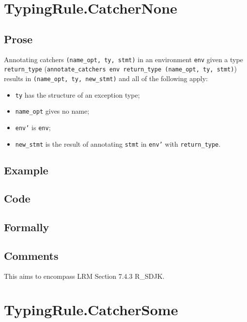 \documentclass{book}
\begin{document}
\section{TypingRule.CatcherNone \label{sec:TypingRule.CatcherNone}}

  \subsection{Prose}
   Annotating catchers \texttt{(name\_opt, ty, stmt)} in an environment
\texttt{env} given a type \texttt{return\_type} (\texttt{annotate\_catchers env
return\_type (name\_opt, ty, stmt)}) results in \texttt{(name\_opt, ty,
new\_stmt)} and all of the following apply:
   \begin{itemize}
   \item \texttt{ty} has the structure of an exception type;
   \item \texttt{name\_opt} gives no name;
   \item \texttt{env'} is \texttt{env};
   \item \texttt{new\_stmt} is the result of annotating \texttt{stmt} in \texttt{env'} with \texttt{return\_type}.
   \end{itemize}

  \subsection{Example}

  \subsection{Code}

\begin{emptyformal}
    \subsection{Formally}
\end{emptyformal}

\subsection{Comments}
    This aims to encompass LRM Section 7.4.3 R\_SDJK.

\section{TypingRule.CatcherSome \label{sec:TypingRule.CatcherSome}}
\end{document}
